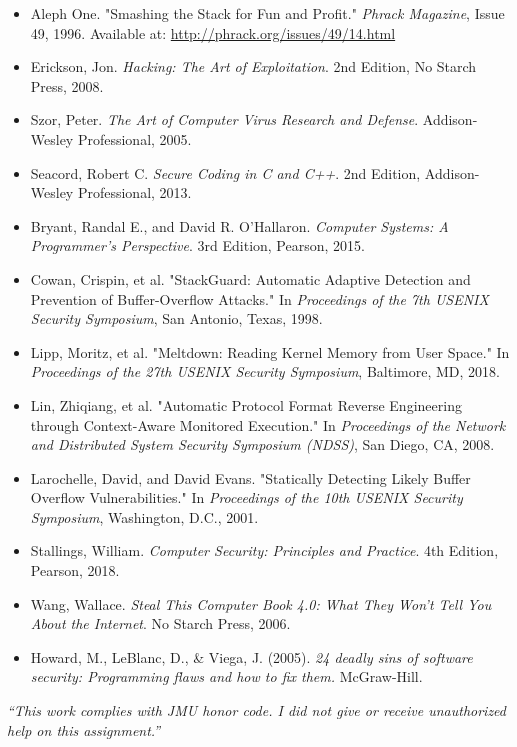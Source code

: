 \documentclass[12pt]{article}
\begin{document}
\begin{itemize}
    \item Aleph One. "Smashing the Stack for Fun and Profit." \textit{Phrack Magazine}, Issue 49, 1996. Available at: \url{http://phrack.org/issues/49/14.html}
    \item Erickson, Jon. \textit{Hacking: The Art of Exploitation}. 2nd Edition, No Starch Press, 2008.
    \item Szor, Peter. \textit{The Art of Computer Virus Research and Defense}. Addison-Wesley Professional, 2005.
    \item Seacord, Robert C. \textit{Secure Coding in C and C++}. 2nd Edition, Addison-Wesley Professional, 2013.
    \item Bryant, Randal E., and David R. O'Hallaron. \textit{Computer Systems: A Programmer's Perspective}. 3rd Edition, Pearson, 2015.
    \item Cowan, Crispin, et al. "StackGuard: Automatic Adaptive Detection and Prevention of Buffer-Overflow Attacks." In \textit{Proceedings of the 7th USENIX Security Symposium}, San Antonio, Texas, 1998.
    \item Lipp, Moritz, et al. "Meltdown: Reading Kernel Memory from User Space." In \textit{Proceedings of the 27th USENIX Security Symposium}, Baltimore, MD, 2018.
    \item Lin, Zhiqiang, et al. "Automatic Protocol Format Reverse Engineering through Context-Aware Monitored Execution." In \textit{Proceedings of the Network and Distributed System Security Symposium (NDSS)}, San Diego, CA, 2008.
    \item Larochelle, David, and David Evans. "Statically Detecting Likely Buffer Overflow Vulnerabilities." In \textit{Proceedings of the 10th USENIX Security Symposium}, Washington, D.C., 2001.
    \item Stallings, William. \textit{Computer Security: Principles and Practice}. 4th Edition, Pearson, 2018.
    \item Wang, Wallace. \textit{Steal This Computer Book 4.0: What They Won't Tell You About the Internet}. No Starch Press, 2006.
    \item Howard, M., LeBlanc, D., \& Viega, J. (2005). \textit{24 deadly sins of software security: Programming flaws and how to fix them.} McGraw-Hill.
\end{itemize}

\vfill
{\color{red}\textit{“This work complies with JMU honor code. I did not give or receive unauthorized help on this assignment.”}}
\end{document}
